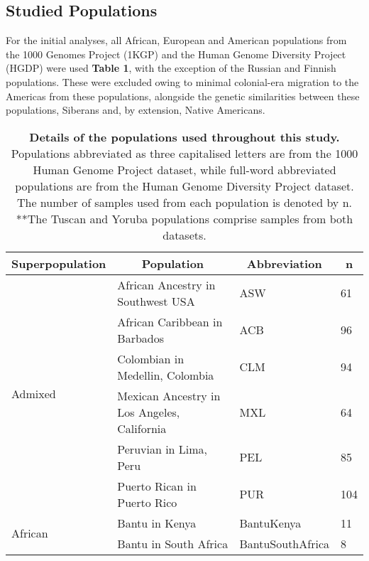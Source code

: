 \documentclass[11pt]{article}
\begin{document}
\subsection{Studied Populations}


For the initial analyses, all African, European and American populations from the 1000 Genomes Project (1KGP) and the Human Genome Diversity Project (HGDP) were used \textbf{Table 1}, with the exception of the Russian and Finnish populations. These were excluded owing to minimal colonial-era migration to the Americas from these populations, alongside the genetic similarities between these populations, Siberans and, by extension, Native Americans.



\begin{table}[htb]
    \centering
    \caption{
        \textbf{Details of the populations used throughout this study.} 
        Populations abbreviated as three capitalised letters are from the 1000 Human Genome Project dataset, while full-word abbreviated populations are from the Human Genome Diversity Project dataset. The number of samples used from each population is denoted by n. \\
        **The Tuscan and Yoruba populations comprise samples from both datasets.
        }
    \vspace{.2cm}
    \small
    \begin{tabular}{ |p{3cm}||p{8cm}|p{3cm}|p{0.8cm}|  }
    \hline
    \multicolumn{1}{|c||}{\textbf{Superpopulation}} &
    \multicolumn{1}{c|}{\textbf{Population}} & 
    \multicolumn{1}{c|}{\textbf{Abbreviation}} & %
    \multicolumn{1}{c|}{\textbf{n}}\\
    \hline
    \hline
    \multirow{6}{*}{Admixed}  %
        &African Ancestry in Southwest USA & ASW & 61 \\
        &African Caribbean in Barbados & ACB & 96 \\
        &Colombian in Medellin, Colombia & CLM & 94 \\
        &Mexican Ancestry in Los Angeles, California & MXL & 64 \\
        &Peruvian in Lima, Peru & PEL & 85 \\
        &Puerto Rican in Puerto Rico & PUR & 104 \\
        \hline
    \multirow{11}{*}{African}
        &Bantu in Kenya & BantuKenya & 11 \\
        &Bantu in South Africa & BantuSouthAfrica & 8 \\

\end{tabular}
\end{table}
\end{document}

